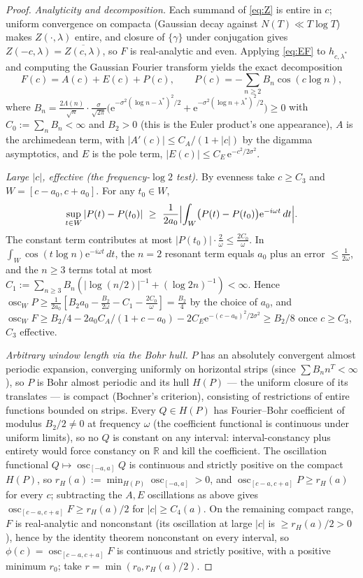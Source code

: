 \documentclass[11pt]{amsart}
\theoremstyle{plain}
\theoremstyle{definition}
\theoremstyle{remark}
\newcommand{\RR}{\mathbb{R}}
\newcommand{\eE}{\mathrm{e}}
\newcommand{\dd}{\,d}
\DeclareMathOperator{\osc}{osc}
\begin{document}
\begin{proof}
\emph{Analyticity and decomposition.} Each summand of \eqref{eq:Z} is entire in $c$; uniform
convergence on compacta (Gaussian decay against $N(T)\ll T\log T$) makes $Z(\cdot,\lambda)$ entire,
and closure of $\{\gamma\}$ under conjugation gives $Z(-c,\lambda)=\overline{Z(c,\lambda)}$, so
$F$ is real-analytic and even. Applying \eqref{eq:EF} to $h_{c,\lambda^*}$ and computing the
Gaussian Fourier transform yields the exact decomposition
\begin{equation}\label{eq:decomp}
F(c)=A(c)+E(c)+P(c),\qquad
P(c)=-\sum_{n\ge2}B_n\cos(c\log n),
\end{equation}
where
$B_n=\frac{2\Lambda(n)}{\sqrt n}\cdot\frac{\sigma}{\sqrt{2\pi}}
\bigl(\eE^{-\sigma^2(\log n-\lambda^*)^2/2}+\eE^{-\sigma^2(\log n+\lambda^*)^2/2}\bigr)\ge0$
with $C_0:=\sum_nB_n<\infty$ and $B_2>0$ (this is the Euler product's one appearance), $A$ is the
archimedean term, with $|A'(c)|\le C_A/(1+|c|)$ by the digamma asymptotics, and $E$ is the pole
term, $|E(c)|\le C_E\,\eE^{-c^2/2\sigma^2}$.

\emph{Large $|c|$, effective (the frequency-$\log2$ test).} By evenness take $c\ge C_3$ and
$W=[c-a_0,c+a_0]$. For any $t_0\in W$,
\[
\sup_{t\in W}|P(t)-P(t_0)|\ \ge\ \frac1{2a_0}\Bigl|\int_W\bigl(P(t)-P(t_0)\bigr)\eE^{-i\omega t}\dd
t\Bigr|.
\]
The constant term contributes at most $|P(t_0)|\cdot\frac2\omega\le\frac{2C_0}\omega$. In
$\int_W\cos(t\log n)\eE^{-i\omega t}\dd t$, the $n=2$ resonant term equals $a_0$ plus an error
$\le\frac1{2\omega}$, and the $n\ge3$ terms total at most
$C_1:=\sum_{n\ge3}B_n(|\log(n/2)|^{-1}+(\log2n)^{-1})<\infty$. Hence
$\osc_WP\ge\frac1{2a_0}[B_2a_0-\frac{B_2}{2\omega}-C_1-\frac{2C_0}\omega]=\frac{B_2}4$ by the
choice of $a_0$, and $\osc_WF\ge B_2/4-2a_0C_A/(1+c-a_0)-2C_E\eE^{-(c-a_0)^2/2\sigma^2}\ge B_2/8$
once $c\ge C_3$, $C_3$ effective.

\emph{Arbitrary window length via the Bohr hull.} $P$ has an absolutely convergent almost periodic
expansion, converging uniformly on horizontal strips (since $\sum B_nn^T<\infty$), so $P$ is Bohr
almost periodic and its hull $H(P)$ --- the uniform closure of its translates --- is compact
(Bochner's criterion), consisting of restrictions of entire functions bounded on strips. Every
$Q\in H(P)$ has Fourier--Bohr coefficient of modulus $B_2/2\ne0$ at frequency $\omega$ (the
coefficient functional is continuous under uniform limits), so no $Q$ is constant on any interval:
interval-constancy plus entirety would force constancy on $\RR$ and kill the coefficient. The
oscillation functional $Q\mapsto\osc_{[-a,a]}Q$ is continuous and strictly positive on the compact
$H(P)$, so $r_H(a):=\min_{H(P)}\osc_{[-a,a]}>0$, and
$\osc_{[c-a,c+a]}P\ge r_H(a)$ for every $c$; subtracting the $A,E$ oscillations as above gives
$\osc_{[c-a,c+a]}F\ge r_H(a)/2$ for $|c|\ge C_4(a)$. On the remaining compact range, $F$ is
real-analytic and nonconstant (its oscillation at large $|c|$ is $\ge r_H(a)/2>0$), hence by the
identity theorem nonconstant on every interval, so $\phi(c)=\osc_{[c-a,c+a]}F$ is continuous and
strictly positive, with a positive minimum $r_0$; take $r=\min(r_0,r_H(a)/2)$.
\end{proof}
\end{document}
